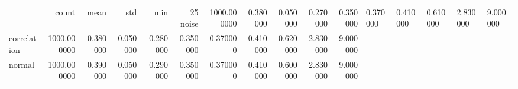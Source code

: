 \begin{tabular}{lrrrrrrrrrr}
\toprule
 & count & mean & std & min & 25%
\midrule
noise & 1000.000000 & 0.380000 & 0.050000 & 0.270000 & 0.350000 & 0.370000 & 0.410000 & 0.610000 & 2.830000 & 9.000000 \\
correlation & 1000.000000 & 0.380000 & 0.050000 & 0.280000 & 0.350000 & 0.370000 & 0.410000 & 0.620000 & 2.830000 & 9.000000 \\
normal & 1000.000000 & 0.390000 & 0.050000 & 0.290000 & 0.350000 & 0.370000 & 0.410000 & 0.600000 & 2.830000 & 9.000000 \\
\bottomrule
\end{tabular}

